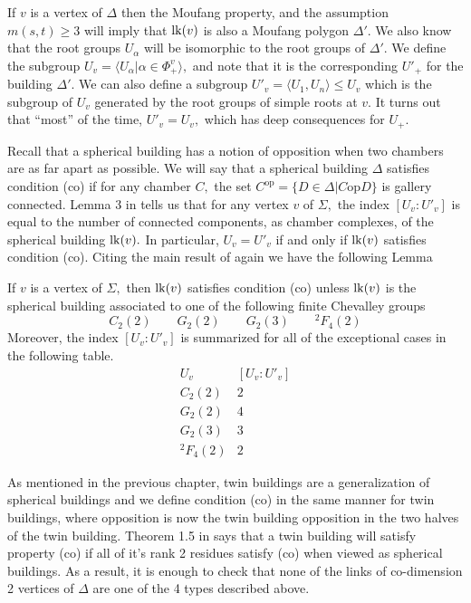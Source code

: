 \documentclass[class=book, crop=false,12 pt]{standalone}
\begin{document}
If $v$ is a vertex of $\Delta$ then the Moufang property, and the assumption $m(s,t)\ge 3$ will imply that $\mathrm{lk}(v)$ is also a Moufang polygon $\Delta'.$ We also know that the root groups $U_\alpha$ will be isomorphic to the root groups of $\Delta'.$ We define the subgroup $U_v=\langle U_\alpha|\alpha\in \Phi_+^v\rangle,$ and note that it is the corresponding $U'_+$ for the building $\Delta'.$ We can also define a subgroup $U'_v=\langle U_1,U_n\rangle\le U_v$ which is the subgroup of $U_v$ generated by the root groups of simple roots at $v.$ It turns out that ``most'' of the time, $U'_v=U_v,$ which has deep consequences for $U_+.$

Recall that a spherical building has a notion of opposition when two chambers are as far apart as possible. We will say that a spherical building $\Delta$ satisfies condition (co) if for any chamber $C,$ the set $C^\text{op}=\{D\in \Delta|C\mathrm{ op }D\}$ is gallery connected. Lemma 3 in \cite{cop} tells us that for any vertex $v$ of $\Sigma,$ the index $[U_v:U'_v]$ is equal to the number of connected components, as chamber complexes, of the spherical building $\mathrm{lk}(v).$ In particular, $U_v=U'_v$ if and only if $\mathrm{lk}(v)$ satisfies condition (co). Citing the main result of \cite{cop} again we have the following Lemma

\begin{lemma}
	\label{lem:index}
	If $v$ is a vertex of $\Sigma,$ then $\mathrm{lk}(v)$ satisfies condition (co) unless $\mathrm{lk}(v)$ is the spherical building associated to one of the following finite Chevalley groups
	\[
		C_2(2)\qquad G_2(2) \qquad G_2(3) \qquad {}^2F_4(2)
	\]
	Moreover, the index $[U_v:U'_v]$ is summarized for all of the exceptional cases in the following table.
	\[
		\begin{array}{c|c}
			U_v&[U_v:U'_v]\\\hline
			C_2(2)&2\\
			G_2(2)&4\\
			G_2(3)&3\\
			{}^2F_4(2)&2
		\end{array}
	\]
\end{lemma}

As mentioned in the previous chapter, twin buildings are a generalization of spherical buildings and we define condition (co) in the same manner for twin buildings, where opposition is now the twin building opposition in the two halves of the twin building. Theorem 1.5 in \cite{globalco} says that a twin building will satisfy property (co) if all of it's rank 2 residues satisfy (co) when viewed as spherical buildings. As a result, it is enough to check that none of the links of co-dimension 2 vertices of $\Delta$ are one of the 4 types described above.
\end{document}
